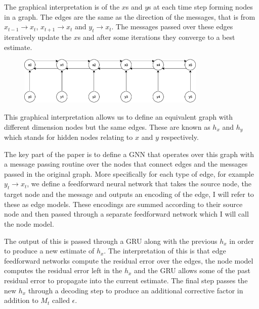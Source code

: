\documentclass[]{../resources/final_report}
\begin{document}
  

The graphical interpretation is of the $x$s and $y$s at each time step forming nodes in a graph. The 
edges are the same as the direction of the messages, that is from $x_{t-1} \rightarrow x_t$, $x_{t+1} \rightarrow x_t$ and $y_t \rightarrow x_t$. 
The messages passed over these edges iteratively update the $x$s and after some iterations they 
converge to a best estimate.


\begin{figure}[h]
  \centering
  \includegraphics[width=0.8\textwidth]{GraphicalKalmanModel.png}  
  \caption{}
  \label{}
\end{figure}

This graphical interpretation allows us to define an equivalent graph with different dimension nodes 
but the same edges. These are known as $h_x$ and $h_y$ which stands for hidden nodes relating to $x$ 
and $y$ respectively. 


The key part of the paper is to define a GNN that operates over this graph with a message passing
routine over the nodes that connect edges and the messages passed in the original 
graph. More specifically for each type of edge, for example $y_t \rightarrow x_t$, we define a 
feedforward neural network that takes the source node, the target node and the message and outputs 
an encoding of the edge, I will refer to these as edge models. These encodings are summed according 
to their source node and then passed through a separate feedforward network which I will call the 
node model. 

The output of this is passed through a GRU along with the previous $h_x$ in order to produce a new 
estimate of $h_x$. The interpretation of this is that edge feedforward networks compute the residual 
error over the edges, the node model computes the residual error left in the $h_x$ and the GRU allows 
some of the past residual error to propagate into the current estimate. The final step passes the new 
$h_x$ through a decoding step to produce an additional corrective factor in addition to $M_t$ called $\epsilon$.
\end{document}
